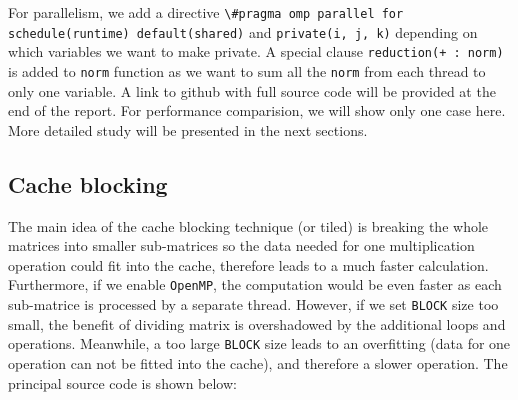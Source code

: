 \documentclass[
  12pt,
  xcolor = usenames,dvipsnames]{article}
\newcommand{\passthrough}[1]{#1}
\begin{document}
For parallelism, we add a directive \passthrough{\lstinline!\#pragma omp parallel for schedule(runtime) default(shared)!} and \passthrough{\lstinline!private(i, j, k)!} depending on which variables we want to make private. A special clause \passthrough{\lstinline!reduction(+ : norm)!} is added to \passthrough{\lstinline!norm!} function as we want to sum all the \passthrough{\lstinline!norm!} from each thread to only one variable. A link to github with full source code will be provided at the end of the report. For performance comparision, we will show only one case here. More detailed study will be presented in the next sections.

\begin{table}[!h]
\centering
{}
\end{table}

\hypertarget{cache-blocking}{%
\subsection{Cache blocking}\label{cache-blocking}}

The main idea of the cache blocking technique (or tiled) is breaking the whole matrices into smaller sub-matrices so the data needed for one multiplication operation could fit into the cache, therefore leads to a much faster calculation. Furthermore, if we enable \passthrough{\lstinline!OpenMP!}, the computation would be even faster as each sub-matrice is processed by a separate thread. However, if we set \passthrough{\lstinline!BLOCK!} size too small, the benefit of dividing matrix is overshadowed by the additional loops and operations. Meanwhile, a too large \passthrough{\lstinline!BLOCK!} size leads to an overfitting (data for one operation can not be fitted into the cache), and therefore a slower operation. The principal source code is shown below:
\end{document}
